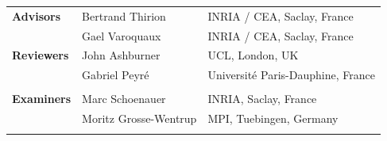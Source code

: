 \documentclass[nobib, a4paper, notoc, twoside, justified, openany]{tufte-book}
\begin{document}
\begin{titlepage}
\begin{fullwidth}
\begin{center}
{\LARGE
\begin{tabular}{lll}
\vspace{1pc}
\textbf{Advisors} & Bertrand Thirion & INRIA / CEA, Saclay, France \\
\vspace{1pc}
 & Gael Varoquaux & INRIA / CEA, Saclay, France \\
\vspace{1pc}
  \textbf{Reviewers} & John Ashburner  & UCL, London, UK  \\
  \vspace{1pc}  
& Gabriel Peyr\'e  & Universit\'e Paris-Dauphine, France  \\  \\
  \vspace{1pc}
\textbf{Examiners} & Marc Schoenauer & INRIA,  Saclay, France \\
  \vspace{1pc}
 & Moritz Grosse-Wentrup  & MPI, Tuebingen, Germany \\  
\vspace{1pc}
\end{tabular}
}


\end{center}
\end{fullwidth}
\end{titlepage}
\end{document}
